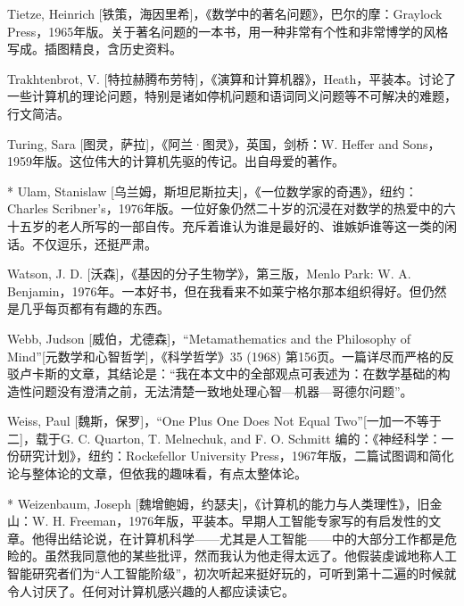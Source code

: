 \begin{thebib}
\begin{biblist}
\item Tietze, Heinrich [铁策，海因里希]，《数学中的著名问题》，巴尔的摩：Graylock Press，1965年版。关于著名问题的一本书，用一种非常有个性和非常博学的风格写成。插图精良，含历史资料。

\item Trakhtenbrot, V. [特拉赫腾布劳特]，《演算和计算机器》，Heath，平装本。讨论了一些计算机的理论问题，特别是诸如停机问题和语词同义问题等不可解决的难题，行文简洁。

\item Turing, Sara [图灵，萨拉]，《阿兰·图灵》，英国，剑桥：W. Heffer and Sons，1959年版。这位伟大的计算机先驱的传记。出自母爱的著作。

\item[*] Ulam, Stanislaw [乌兰姆，斯坦尼斯拉夫]，《一位数学家的奇遇》，纽约：Charles Scribner's，1976年版。一位好象仍然二十岁的沉浸在对数学的热爱中的六十五岁的老人所写的一部自传。充斥着谁认为谁是最好的、谁嫉妒谁等这一类的闲话。不仅逗乐，还挺严肃。

\item Watson, J. D. [沃森]，《基因的分子生物学》，第三版，Menlo Park: W. A. Benjamin，1976年。一本好书，但在我看来不如莱宁格尔那本组织得好。但仍然是几乎每页都有有趣的东西。

\item Webb, Judson [威伯，尤德森]，“Metamathematics and the Philosophy of Mind”[元数学和心智哲学]，《科学哲学》35 (1968) 第156页。一篇详尽而严格的反驳卢卡斯的文章，其结论是：“我在本文中的全部观点可表述为：在数学基础的构造性问题没有澄清之前，无法清楚一致地处理心智—机器—哥德尔问题”。

\item Weiss, Paul [魏斯，保罗]，“One Plus One Does Not Equal Two”[一加一不等于二]，载于G. C. Quarton, T. Melnechuk, and F. O. Schmitt 编的：《神经科学：一份研究计划》，纽约：Rockefellor University Press，1967年版，二篇试图调和简化论与整体论的文章，但依我的趣味看，有点太整体论。

\item[*] Weizenbaum, Joseph [魏增鲍姆，约瑟夫]，《计算机的能力与人类理性》，旧金山：W. H. Freeman，1976年版，平装本。早期人工智能专家写的有启发性的文章。他得出结论说，在计算机科学——尤其是人工智能——中的大部分工作都是危睑的。虽然我同意他的某些批评，然而我认为他走得太远了。他假装虔诚地称人工智能研究者们为“人工智能阶级”，初次听起来挺好玩的，可听到第十二遍的时候就令人讨厌了。任何对计算机感兴趣的人都应读读它。


\end{biblist}
\end{thebib}
